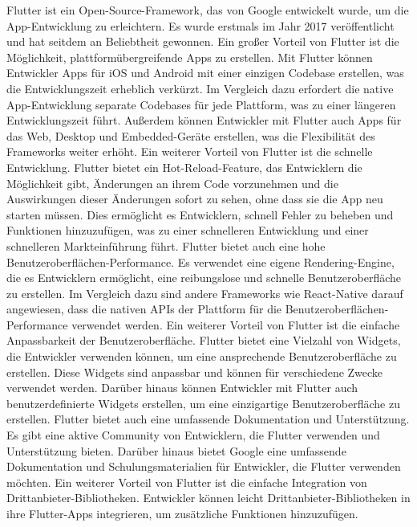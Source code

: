 Flutter ist ein Open-Source-Framework, das von Google entwickelt wurde, um die App-Entwicklung zu erleichtern. 
Es wurde erstmals im Jahr 2017 veröffentlicht und hat seitdem an Beliebtheit gewonnen. 
Ein großer Vorteil von Flutter ist die Möglichkeit, plattformübergreifende Apps zu erstellen. 
Mit Flutter können Entwickler Apps für iOS und Android mit einer einzigen Codebase erstellen, was die Entwicklungszeit erheblich verkürzt. 
Im Vergleich dazu erfordert die native App-Entwicklung separate Codebases für jede Plattform, was zu einer längeren Entwicklungszeit führt. 
Außerdem können Entwickler mit Flutter auch Apps für das Web, Desktop und Embedded-Geräte erstellen, was die Flexibilität des Frameworks weiter erhöht. 
\newline
Ein weiterer Vorteil von Flutter ist die schnelle Entwicklung. Flutter bietet ein Hot-Reload-Feature, das Entwicklern die Möglichkeit gibt, Änderungen an ihrem Code vorzunehmen und die Auswirkungen dieser Änderungen sofort zu sehen, ohne dass sie die App neu starten müssen. 
Dies ermöglicht es Entwicklern, schnell Fehler zu beheben und Funktionen hinzuzufügen, was zu einer schnelleren Entwicklung und einer schnelleren Markteinführung führt. 
Flutter bietet auch eine hohe Benutzeroberflächen-Performance. 
Es verwendet eine eigene Rendering-Engine, die es Entwicklern ermöglicht, eine reibungslose und schnelle Benutzeroberfläche zu erstellen. 
Im Vergleich dazu sind andere Frameworks wie React-Native darauf angewiesen, dass die nativen APIs der Plattform für die Benutzeroberflächen-Performance verwendet werden. 
Ein weiterer Vorteil von Flutter ist die einfache Anpassbarkeit der Benutzeroberfläche. 
Flutter bietet eine Vielzahl von Widgets, die Entwickler verwenden können, um eine ansprechende Benutzeroberfläche zu erstellen. 
Diese Widgets sind anpassbar und können für verschiedene Zwecke verwendet werden. 
\newline
Darüber hinaus können Entwickler mit Flutter auch benutzerdefinierte Widgets erstellen, um eine einzigartige Benutzeroberfläche zu erstellen. 
Flutter bietet auch eine umfassende Dokumentation und Unterstützung. 
Es gibt eine aktive Community von Entwicklern, die Flutter verwenden und Unterstützung bieten. 
Darüber hinaus bietet Google eine umfassende Dokumentation und Schulungsmaterialien für Entwickler, die Flutter verwenden möchten. 
Ein weiterer Vorteil von Flutter ist die einfache Integration von Drittanbieter-Bibliotheken. 
Entwickler können leicht Drittanbieter-Bibliotheken in ihre Flutter-Apps integrieren, um zusätzliche Funktionen hinzuzufügen. 
